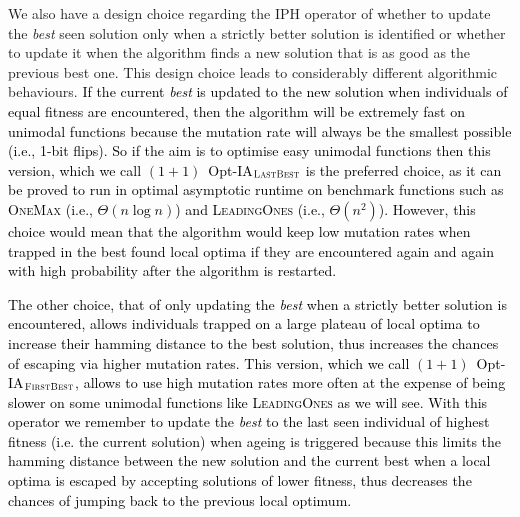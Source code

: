 \documentclass[lettersize,journal]{IEEEtran}
\begin{document}
 
{\color{black} We also have  a design choice regarding the IPH operator  of whether to update the {\it best} seen solution only when a strictly better solution is identified or whether to update it when the algorithm finds a new solution that is as good as the previous best one. 
This design choice leads to considerably different algorithmic behaviours.}
\textcolor{black}{If the current {\it best} is updated to the new solution when individuals of equal fitness are encountered,  then the algorithm will be extremely fast on unimodal functions because the mutation rate will always be the smallest possible (i.e., 1-bit flips). So if the aim is to optimise easy unimodal functions then this version, which we call $(1+1)$~Opt-IA$_{\textsc{LastBest}}$ is the preferred choice, as it can be proved to run in optimal asymptotic runtime on benchmark functions such as \textsc{OneMax} (i.e., $\Theta(n \log n)$) and \textsc{LeadingOnes} (i.e., $\Theta(n^2)$). However, this choice would mean that the algorithm would keep low mutation rates when trapped in the best found local optima if they are encountered again and again with high probability after the algorithm is restarted.}

\textcolor{black}{
The other choice, that of only updating the {\it best} when a strictly better solution is encountered, allows individuals trapped on a large plateau of local optima to increase their hamming distance to the best solution, thus increases the chances of escaping via higher mutation rates. This version, which we call $(1+1)$~Opt-IA$_{\textsc{FirstBest}}$, allows to use high mutation rates more often at the expense of being slower on some unimodal functions like \textsc{LeadingOnes} as we will see. With this operator we remember to update the {\it best} to the last seen individual of highest fitness (i.e. the current solution) when ageing is triggered because this limits the hamming distance between the new solution and the current best when a local optima is escaped by accepting solutions of lower fitness, thus decreases the chances of jumping back to the previous local optimum.}
	
\end{document}
